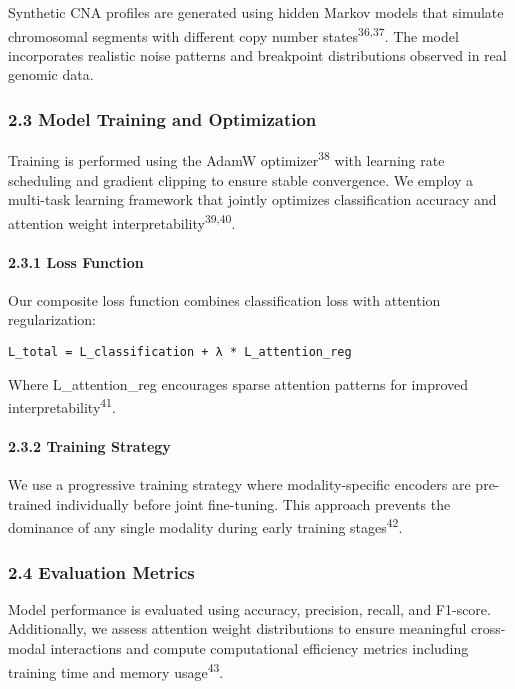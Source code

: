 Synthetic CNA profiles are generated using hidden Markov models that
simulate chromosomal segments with different copy number
states\textsuperscript{36,37}. The model incorporates realistic noise
patterns and breakpoint distributions observed in real genomic data.

\subsubsection{2.3 Model Training and
Optimization}\label{model-training-and-optimization}

Training is performed using the AdamW optimizer\textsuperscript{38} with
learning rate scheduling and gradient clipping to ensure stable
convergence. We employ a multi-task learning framework that jointly
optimizes classification accuracy and attention weight
interpretability\textsuperscript{39,40}.

\paragraph{2.3.1 Loss Function}\label{loss-function}

Our composite loss function combines classification loss with attention
regularization:

\begin{verbatim}
L_total = L_classification + λ * L_attention_reg
\end{verbatim}

Where L\_attention\_reg encourages sparse attention patterns for
improved interpretability\textsuperscript{41}.

\paragraph{2.3.2 Training Strategy}\label{training-strategy}

We use a progressive training strategy where modality-specific encoders
are pre-trained individually before joint fine-tuning. This approach
prevents the dominance of any single modality during early training
stages\textsuperscript{42}.

\subsubsection{2.4 Evaluation Metrics}\label{evaluation-metrics}

Model performance is evaluated using accuracy, precision, recall, and
F1-score. Additionally, we assess attention weight distributions to
ensure meaningful cross-modal interactions and compute computational
efficiency metrics including training time and memory
usage\textsuperscript{43}.

